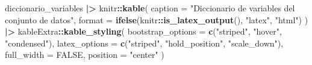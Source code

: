 \documentclass[
]{book}
\newenvironment{Shaded}{\begin{snugshade}}{\end{snugshade}}
\newcommand{\AttributeTok}[1]{\textcolor[rgb]{0.13,0.29,0.53}{#1}}
\newcommand{\ConstantTok}[1]{\textcolor[rgb]{0.56,0.35,0.01}{#1}}
\newcommand{\FunctionTok}[1]{\textcolor[rgb]{0.13,0.29,0.53}{\textbf{#1}}}
\newcommand{\NormalTok}[1]{#1}
\newcommand{\SpecialCharTok}[1]{\textcolor[rgb]{0.81,0.36,0.00}{\textbf{#1}}}
\newcommand{\StringTok}[1]{\textcolor[rgb]{0.31,0.60,0.02}{#1}}
\begin{document}
\begin{Shaded}
\begin{Highlighting}[]
\NormalTok{diccionario\_variables }\SpecialCharTok{|\textgreater{}}
\NormalTok{  knitr}\SpecialCharTok{::}\FunctionTok{kable}\NormalTok{(}
    \AttributeTok{caption =} \StringTok{"Diccionario de variables del conjunto de datos"}\NormalTok{,}
    \AttributeTok{format =} \FunctionTok{ifelse}\NormalTok{(knitr}\SpecialCharTok{::}\FunctionTok{is\_latex\_output}\NormalTok{(), }\StringTok{"latex"}\NormalTok{, }\StringTok{"html"}\NormalTok{)}
\NormalTok{  ) }\SpecialCharTok{|\textgreater{}}
\NormalTok{  kableExtra}\SpecialCharTok{::}\FunctionTok{kable\_styling}\NormalTok{(}
    \AttributeTok{bootstrap\_options =} \FunctionTok{c}\NormalTok{(}\StringTok{"striped"}\NormalTok{, }\StringTok{"hover"}\NormalTok{, }\StringTok{"condensed"}\NormalTok{),}
    \AttributeTok{latex\_options =} \FunctionTok{c}\NormalTok{(}\StringTok{"striped"}\NormalTok{, }\StringTok{"hold\_position"}\NormalTok{, }\StringTok{"scale\_down"}\NormalTok{),}
    \AttributeTok{full\_width =} \ConstantTok{FALSE}\NormalTok{,}
    \AttributeTok{position =} \StringTok{"center"}
\NormalTok{  )}
\end{Highlighting}
\end{Shaded}
\end{document}
